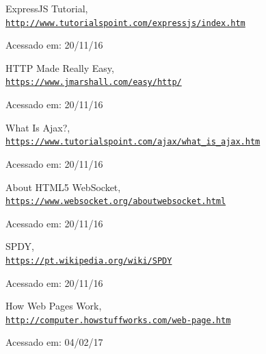 \documentclass[a4paper,12pt]{article}
\begin{document}
\begin{thebibliography}{50}
ExpressJS Tutorial,
\\\texttt{\url{http://www.tutorialspoint.com/expressjs/index.htm}}

Acessado em: 20/11/16


HTTP Made Really Easy,
\\\texttt{\url{https://www.jmarshall.com/easy/http/}}

Acessado em: 20/11/16


What Is Ajax?,
\\\texttt{\url{https://www.tutorialspoint.com/ajax/what_is_ajax.htm}}

Acessado em: 20/11/16


About HTML5 WebSocket,
\\\texttt{\url{https://www.websocket.org/aboutwebsocket.html}}

Acessado em: 20/11/16


SPDY,
\\\texttt{\url{https://pt.wikipedia.org/wiki/SPDY}}

Acessado em: 20/11/16


How Web Pages Work,
\\\texttt{\url{http://computer.howstuffworks.com/web-page.htm}}

Acessado em: 04/02/17



\end{thebibliography}
\end{document}
